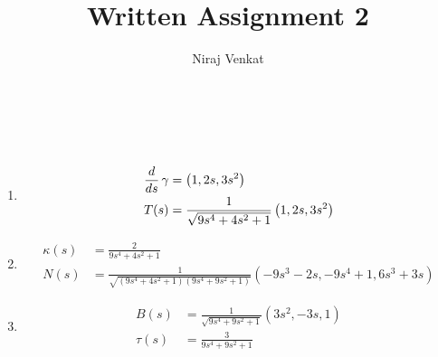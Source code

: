 \documentclass{article}
\def\nt{\notag}
\begin{document}
\title{Written Assignment 2}

\author{Niraj Venkat}

\date{}

\maketitle

\vspace{.8cm}
\\\\

\begin{enumerate}[label=(\alph*)]
    \item
    \begin{align*}
        \frac{d}{ds}\,\gamma &= \left(1,2s,3s^2\right) \\
        T(s) &= \frac{1}{\sqrt{9 s^4+4 s^2+1}} \left(1, 2 s, 3 s^2\right) \nt
    \end{align*}


    \item
    \begin{align*} 
        \kappa(s) &= \frac{2}{9 s^4+4 s^2+1} \\
        N(s) &= \frac{1}{\sqrt{(9 s^4+4 s^2+1)(9 s^4+9 s^2+1)}} \left(-9s^3-2s, -9s^4 + 1, 6s^3 + 3s\right)
    \end{align*}

    \item
    \begin{align*}
        B(s) &= \frac{1}{\sqrt{9 s^4+9 s^2+1}} \left(3s^2,-3s,1\right)\\
        \tau(s) &= \frac{3}{9 s^4+9 s^2+1}
    \end{align*}
\end{enumerate}


\vspace{1.8cm}
\\\\
\end{document}

